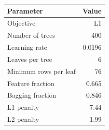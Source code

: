 \begin{tabular}{lr}
\toprule
\textbf{Parameter} & \textbf{Value} \\
\midrule
Objective & L1 \\
Number of trees & 400 \\
Learning rate & 0.0196 \\
Leaves per tree & 6 \\
Minimum rows per leaf & 76 \\
Feature fraction & 0.665 \\
Bagging fraction & 0.846 \\
L1 penalty & 7.44 \\
L2 penalty & 1.99 \\
\bottomrule
\end{tabular}
